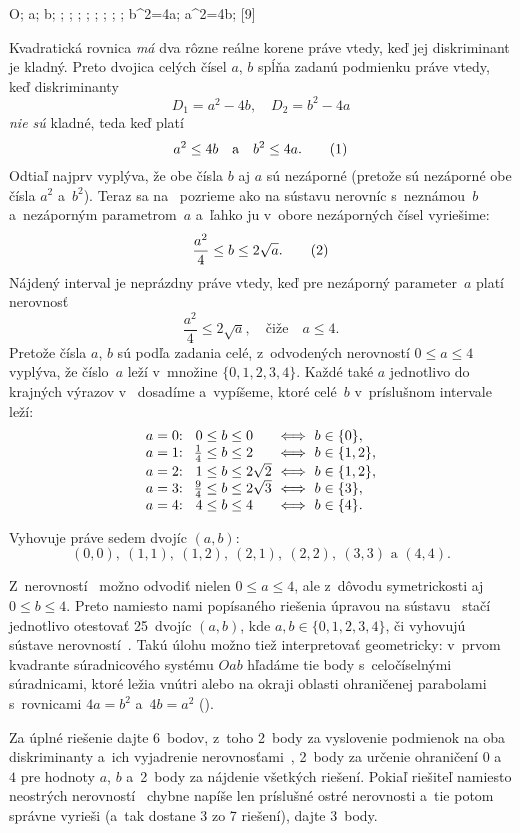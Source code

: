 {%
\fontplace
\ltpoint O; \bpoint a; \rpoint b;
; ; ; ;
; ; ; ;
\lpoint b^2=4a; \bpoint a^2=4b;
[9] \hfil\Obr

Kvadratická rovnica {\it má\/} dva rôzne reálne korene
práve vtedy, keď jej diskriminant je kladný. Preto dvojica celých čísel $a$, $b$
spĺňa zadanú podmienku práve vtedy, keď diskriminanty
$$
D_1=a^2-4b,\quad D_2=b^2-4a
$$
{\it nie sú\/} kladné, teda keď platí
$$
a^2\le4b\quad\text{a}\quad b^2\le4a.        \tag1
$$
Odtiaľ najprv vyplýva, že obe čísla $b$ aj $a$ sú
nezáporné (pretože sú nezáporné obe čísla $a^2$ a~$b^2$). Teraz sa
na~ pozrieme ako na sústavu nerovníc s~neznámou~$b$ 
a~nezáporným parametrom~$a$ a~ľahko ju v~obore nezáporných čísel
vyriešime:
$$
\frac{a^2}{4}\le b\le2\sqrt{a}.        \tag2
$$
Nájdený interval je neprázdny práve vtedy, keď pre nezáporný
parameter~$a$ platí nerovnosť
$$
\frac{a^2}{4}\le2\sqrt{a},\quad\text{čiže}\quad
a\le4.
$$
Pretože čísla $a$, $b$ sú podľa zadania celé, z~odvodených
nerovností $0\le a\le 4$ vyplýva, že číslo~$a$ leží v~množine
$\{0,1,2,3,4\}$. Každé také $a$ jednotlivo do krajných výrazov
v~ dosadíme a~vypíšeme, ktoré celé~$b$ v~príslušnom intervale
leží:
$$
\vbox{\let\\=\cr
\halign{\hss$#$: \ &\hss$#$&${}#$ \hss&${}\Longleftrightarrow\ #$\hss\cr
a=0&       0&\le b\le0        & b\in\{0\},\\
a=1& \frac14&\le b\le2        & b\in\{1,2\},\\
a=2&       1&\le b\le2\sqrt2  & b\in\{1,2\},\\
a=3& \frac94&\le b\le2\sqrt{3}& b\in\{3\},\\
a=4&       4&\le b\le4        & b\in\{4\}.\\
}}
$$

\odpoved
Vyhovuje práve sedem dvojíc $(a,b)$:
$$
(0,0),\ (1,1),\ (1,2),\ (2,1),\ (2,2),\ (3,3) \text{ a~} (4,4).
$$


\poznamka
Z~nerovností~ možno odvodiť nielen $0\le a\le
4$, ale z~dôvodu symetrickosti aj $0\le b\le 4$. Preto namiesto nami
popísaného riešenia úpravou na sústavu~ stačí jednotlivo
otestovať 25~dvojíc $(a,b)$, kde $a,b\in\{0,1,2,3,4\}$, či
vyhovujú sústave nerovností~. Takú úlohu možno tiež
interpretovať geometricky: v~prvom kvadrante súradnicového
systému $Oab$ hľadáme tie body s~celočíselnými súradnicami, ktoré
ležia vnútri alebo na okraji oblasti ohraničenej parabolami 
s~rovnicami $4a=b^2$ a~$4b=a^2$ (\obr).
\inspicture{}


\nobreak\medskip\petit\noindent
Za úplné riešenie dajte 6~bodov, z~toho 2~body
za vyslovenie podmienok na oba diskriminanty a~ich
vyjadrenie nerovnosťami~, 2~body za určenie ohraničení $0$ a~$4$
pre hodnoty $a$, $b$ a~2~body za nájdenie všetkých riešení. Pokiaľ
riešiteľ namiesto neostrých nerovností~ chybne napíše len
príslušné ostré nerovnosti a~tie potom správne vyrieši (a~tak dostane
3 zo 7 riešení), dajte 3~body.
\endpetit
\bigbreak}


